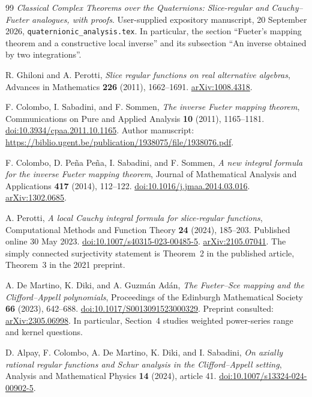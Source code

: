 \documentclass[11pt,a4paper]{article}
\numberwithin{equation}{section}
\theoremstyle{definition}
\theoremstyle{remark}
\begin{document}
\begingroup
\small
\setlength{\parskip}{0pt}
\begin{thebibliography}{99}
\setlength{\itemsep}{3pt}
\emph{Classical Complex Theorems over the Quaternions: Slice-regular and
Cauchy--Fueter analogues, with proofs}.
User-supplied expository manuscript, 20 September 2026,
\texttt{quaternionic\_analysis.tex}. In particular, the section
``Fueter's mapping theorem and a constructive local inverse'' and its
subsection ``An inverse obtained by two integrations''.

R. Ghiloni and A. Perotti,
\emph{Slice regular functions on real alternative algebras},
Advances in Mathematics \textbf{226} (2011), 1662--1691.
\href{https://arxiv.org/abs/1008.4318}{arXiv:1008.4318}.

F. Colombo, I. Sabadini, and F. Sommen,
\emph{The inverse Fueter mapping theorem},
Communications on Pure and Applied Analysis \textbf{10} (2011),
1165--1181.
\href{https://doi.org/10.3934/cpaa.2011.10.1165}{doi:10.3934/cpaa.2011.10.1165}.
Author manuscript:
\url{https://biblio.ugent.be/publication/1938075/file/1938076.pdf}.

F. Colombo, D. Pe\~na Pe\~na, I. Sabadini, and F. Sommen,
\emph{A new integral formula for the inverse Fueter mapping theorem},
Journal of Mathematical Analysis and Applications \textbf{417} (2014),
112--122.
\href{https://doi.org/10.1016/j.jmaa.2014.03.016}{doi:10.1016/j.jmaa.2014.03.016}.
\href{https://arxiv.org/abs/1302.0685}{arXiv:1302.0685}.

A. Perotti,
\emph{A local Cauchy integral formula for slice-regular functions},
Computational Methods and Function Theory \textbf{24} (2024), 185--203.
Published online 30 May 2023.
\href{https://doi.org/10.1007/s40315-023-00485-5}{doi:10.1007/s40315-023-00485-5}.
\href{https://arxiv.org/abs/2105.07041}{arXiv:2105.07041}.
The simply connected surjectivity statement is Theorem~2 in the
published article, Theorem~3 in the 2021 preprint.

A. De Martino, K. Diki, and A. Guzm\'an Ad\'an,
\emph{The Fueter--Sce mapping and the Clifford--Appell polynomials},
Proceedings of the Edinburgh Mathematical Society \textbf{66} (2023),
642--688.
\href{https://doi.org/10.1017/S0013091523000329}{doi:10.1017/S0013091523000329}.
Preprint consulted:
\href{https://arxiv.org/abs/2305.06998}{arXiv:2305.06998}.
In particular, Section~4 studies weighted power-series range and kernel
questions.

D. Alpay, F. Colombo, A. De Martino, K. Diki, and I. Sabadini,
\emph{On axially rational regular functions and Schur analysis in the
Clifford--Appell setting},
Analysis and Mathematical Physics \textbf{14} (2024), article 41.
\href{https://doi.org/10.1007/s13324-024-00902-5}{doi:10.1007/s13324-024-00902-5}.


\end{thebibliography}
\end{document}
